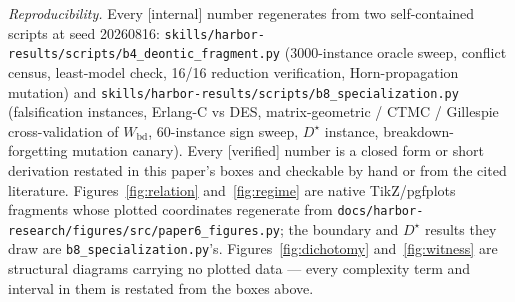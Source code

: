 \documentclass[11pt,a4paper]{article}
\begin{document}
\vspace{0.4em} \noindent\emph{Reproducibility.} Every [internal] number regenerates from two self-contained scripts at seed
20260816: \texttt{skills/harbor-results/scripts/b4\_deontic\_fragment.py} (3000-instance oracle sweep, conflict census,
least-model check, 16/16 reduction verification, Horn-propagation mutation) and
\texttt{skills/harbor-results/scripts/b8\_specialization.py} (falsification instances, Erlang-C vs DES, matrix-geometric /
CTMC / Gillespie cross-validation of $W_{\mathrm{bd}}$, 60-instance sign sweep, $D^\star$ instance, breakdown-forgetting
mutation canary). Every [verified] number is a closed form or short derivation restated in this paper's boxes and checkable by
hand or from the cited literature. Figures~\ref{fig:relation} and~\ref{fig:regime} are native TikZ/pgfplots fragments whose
plotted coordinates regenerate from \texttt{docs/harbor-research/figures/src/paper6\_figures.py}; the boundary and $D^\star$
results they draw are \texttt{b8\_specialization.py}'s. Figures~\ref{fig:dichotomy} and~\ref{fig:witness} are structural
diagrams carrying no plotted data --- every complexity term and interval in them is restated from the boxes above.
\end{document}
